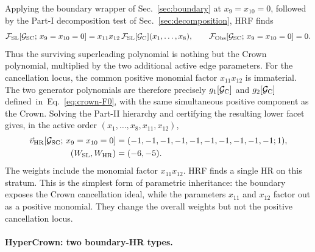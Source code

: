 \documentclass[a4paper,11pt]{article}
\newcommand{\WSL}{W_{\rm SL}}
\newcommand{\WHR}{W_{\rm HR}}
\newcommand{\vHR}{\vec v_{\rm HR}}
\begin{document}
Applying the boundary wrapper of Sec.~\ref{sec:boundary} at
\(x_9=x_{10}=0\), followed by the Part-I decomposition test of
Sec.~\ref{sec:decomposition}, HRF finds
\begin{equation}
 \mathcal F_{\rm SL}[\mathcal G_{\rm SC};\,x_9=x_{10}=0]
 =x_{11}x_{12}\,\mathcal F_{\rm SL}[\mathcal G_{\rm C}](x_1,\ldots,x_8),
 \qquad
 \mathcal F_{\rm Obs}[\mathcal G_{\rm SC};\,x_9=x_{10}=0]=0.
 \label{eq:SC-decomposition}
\end{equation}
Thus the surviving superleading polynomial is nothing but the Crown polynomial, multiplied by the two additional active edge parameters. 
For the cancellation locus, the common positive monomial factor
\(x_{11}x_{12}\) is immaterial.  The two generator polynomials are therefore
precisely \(g_1[\mathcal G_{\rm C}]\) and \(g_2[\mathcal G_{\rm C}]\) defined~in~Eq.~\eqref{eq:crown-F0}, with the same simultaneous positive component as
the Crown.  Solving the Part-II hierarchy and certifying the resulting lower
facet gives, in the active order \((x_1,\ldots,x_8,x_{11},x_{12})\),
\begin{equation}
\begin{aligned}
 \vHR[\mathcal G_{\rm SC};\,x_9=x_{10}=0]
 &=(-1,-1,-1,-1,-1,-1,-1,-1,-1,-1;1),\\
 (\WSL,\WHR)&=(-6,-5).
\end{aligned}
 \label{eq:SC-vector}
\end{equation}
The weights include the monomial factor \(x_{11}x_{12}\).  HRF finds a single
HR on this stratum.  This is the simplest form of parametric inheritance: the
boundary exposes the Crown cancellation ideal, while the parameters
\(x_{11}\) and \(x_{12}\) factor out as a positive monomial.  They change the
overall weights but not the positive cancellation locus.

\paragraph{HyperCrown: two boundary-HR types.}
\end{document}
